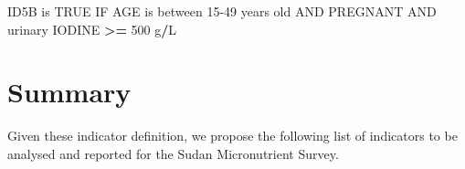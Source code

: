 \documentclass[12pt,a4paper]{article}
\newenvironment{Shaded}{\begin{snugshade}}{\end{snugshade}}
\newcommand{\DecValTok}[1]{\textcolor[rgb]{0.00,0.00,0.81}{#1}}
\newcommand{\NormalTok}[1]{#1}
\newcommand{\OperatorTok}[1]{\textcolor[rgb]{0.81,0.36,0.00}{\textbf{#1}}}
\newcommand{\OtherTok}[1]{\textcolor[rgb]{0.56,0.35,0.01}{#1}}
\newcommand{\StringTok}[1]{\textcolor[rgb]{0.31,0.60,0.02}{#1}}
\begin{document}
\begin{Shaded}
\begin{Highlighting}[]
\NormalTok{ID5B is }\OtherTok{TRUE}\NormalTok{ IF AGE is between }\DecValTok{15-49}\NormalTok{ years old AND }
\NormalTok{  PREGNANT AND urinary IODINE }\OperatorTok{>=}\StringTok{ }\DecValTok{500}\NormalTok{ g}\OperatorTok{/}\NormalTok{L}
\end{Highlighting}
\end{Shaded}

\hypertarget{summary}{%
\section{Summary}\label{summary}}

Given these indicator definition, we propose the following list of indicators to be analysed and reported for the Sudan Micronutrient Survey.
\end{document}
